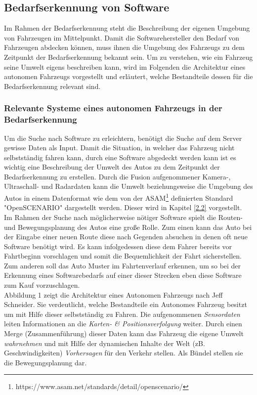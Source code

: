 \subsection{Bedarfserkennung von Software}
Im Rahmen der Bedarfserkennung steht die Beschreibung der eigenen Umgebung von Fahrzeugen im Mittelpunkt. Damit die Softwarehersteller den Bedarf von Fahrzeugen abdecken können, muss ihnen die Umgebung des Fahrzeugs zu dem Zeitpunkt der Bedarfserkennung bekannt sein. Um zu verstehen, wie ein Fahrzeug seine Umwelt eigens beschreiben kann, wird im Folgenden die Architektur eines autonomen Fahrzeugs vorgestellt und erläutert, welche Bestandteile dessen für die Bedarfserkennung relevant sind. 
\subsubsection{Relevante Systeme eines autonomen Fahrzeugs in der Bedarfserkennung}
Um die Suche nach Software zu erleichtern, benötigt die Suche auf dem Server gewisse Daten als Input. Damit die Situation, in welcher das Fahrzeug nicht selbstständig fahren kann, durch eine Software abgedeckt werden kann ist es wichtig eine Beschreibung der Umwelt des Autos zu dem Zeitpunkt der Bedarfserkennung zu erstellen. Durch die Fusion aufgenommener Kamera-, Ultraschall- und Radardaten kann die Umwelt beziehungsweise die Umgebung des Autos in einem Datenformat wie dem von der ASAM\footnote[1.]{https://www.asam.net/standards/detail/openscenario/} definierten Standard "OpenSCENARIO"\cite{b35} dargestellt werden. Dieser wird in Kapitel \ref{2.2} vorgestellt.\\
Im Rahmen der Suche nach möglicherweise nötiger Software spielt die Routen- und Bewegungsplanung des Autos eine große Rolle. Zum einen kann das Auto bei der Eingabe einer neuen Route diese nach Gegenden absuchen in denen oft neue Software benötigt wird. Es kann infolgedessen diese dem Fahrer bereits vor Fahrtbeginn vorschlagen und somit die Bequemlichkeit der Fahrt sicherstellen. Zum anderen soll das Auto  Muster im Fahrtenverlauf erkennen, um so bei der Erkennung eines Softwarebedarfs auf einer dieser Strecken eben diese Software zum Kauf vorzuschlagen.\\
Abbildung 1 zeigt die Architektur eines Autonomen Fahrzeugs nach Jeff Schneider. Sie verdeutlicht, welche Bestandteile ein Autonomes Fahrzeug besitzt um mit Hilfe dieser selbstständig zu Fahren. Die aufgenommenen \textit{Sensordaten} leiten Informationen an die \textit{Karten- \& Positionsverfolgung} weiter. Durch einen Merge (Zusammenführung) dieser Daten kann das Fahrzeug die eigene Umwelt \textit{wahrnehmen} und mit Hilfe der dynamischen Inhalte der Welt (zB. Geschwindigkeiten) \textit{Vorhersagen} für den Verkehr stellen. Als Bündel stellen sie die Bewegungsplanung dar.

